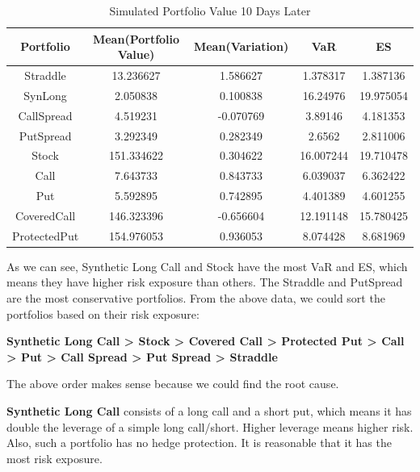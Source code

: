 \documentclass[11pt,en]{elegantpaper}
\begin{document}
\begin{table}[htbp]
    \centering
    \caption{Simulated Portfolio Value 10 Days Later}
    \begin{tabular}{@{}ccccc@{}}
        \toprule
        \textbf{Portfolio} & \textbf{Mean(Portfolio Value)} & \textbf{Mean(Variation)} & \textbf{VaR} & \textbf{ES}\\
        \midrule
        Straddle     &             13.236627 &     1.586627 &   1.378317 &   1.387136 \\
        SynLong      &              2.050838 &     0.100838 &   16.24976 &  19.975054 \\
        CallSpread   &              4.519231 &    -0.070769 &    3.89146 &   4.181353 \\
        PutSpread    &              3.292349 &     0.282349 &     2.6562 &   2.811006 \\
        Stock        &            151.334622 &     0.304622 &  16.007244 &  19.710478 \\
        Call         &              7.643733 &     0.843733 &   6.039037 &   6.362422 \\
        Put          &              5.592895 &     0.742895 &   4.401389 &   4.601255 \\
        CoveredCall  &            146.323396 &    -0.656604 &  12.191148 &  15.780425 \\
        ProtectedPut &            154.976053 &     0.936053 &   8.074428 &   8.681969 \\
        \bottomrule
    \end{tabular}
\end{table}

    
As we can see, Synthetic Long Call and Stock have the most VaR and ES, which means they have higher risk exposure than others. The Straddle and PutSpread are the most conservative portfolios. From the above data, we could sort the portfolios based on their risk exposure:

\textbf{Synthetic Long Call > Stock > Covered Call > Protected Put > Call > Put > Call Spread > Put Spread > Straddle}

The above order makes sense because we could find the root cause. 

\textbf{Synthetic Long Call} consists of a long call and a short put, which means it has double the leverage of a simple long call/short. Higher leverage means higher risk. Also, such a portfolio has no hedge protection. It is reasonable that it has the most risk exposure.
\end{document}
